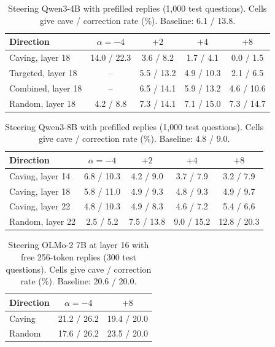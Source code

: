 \begin{table}[tbp]
\centering
\small
\caption{Steering Qwen3-4B with prefilled replies (1{,}000 test questions). Cells give cave / correction rate (\%). Baseline: 6.1 / 13.8.}
\label{tab:steer4b}
\begin{tabular}{lcccc}
\toprule
Direction & $\alpha=-4$ & $+2$ & $+4$ & $+8$ \\
\midrule
Caving, layer 18 & 14.0 / 22.3 & 3.6 / 8.2 & 1.7 / 4.1 & 0.0 / 1.5 \\
Targeted, layer 18 & -- & 5.5 / 13.2 & 4.9 / 10.3 & 2.1 / 6.5 \\
Combined, layer 18 & -- & 6.5 / 14.1 & 5.9 / 13.2 & 4.6 / 10.6 \\
Random, layer 18 & 4.2 / 8.8 & 7.3 / 14.1 & 7.1 / 15.0 & 7.3 / 14.7 \\
\bottomrule
\end{tabular}
\end{table}

\begin{table}[tbp]
\centering
\small
\caption{Steering Qwen3-8B with prefilled replies (1{,}000 test questions). Cells give cave / correction rate (\%). Baseline: 4.8 / 9.0.}
\label{tab:steer8b}
\begin{tabular}{lcccc}
\toprule
Direction & $\alpha=-4$ & $+2$ & $+4$ & $+8$ \\
\midrule
Caving, layer 14 & 6.8 / 10.3 & 4.2 / 9.0 & 3.7 / 7.9 & 3.2 / 7.9 \\
Caving, layer 18 & 5.8 / 11.0 & 4.9 / 9.3 & 4.8 / 9.3 & 4.9 / 9.7 \\
Caving, layer 22 & 4.8 / 10.3 & 4.9 / 8.3 & 4.6 / 7.2 & 5.4 / 6.6 \\
Random, layer 22 & 2.5 / 5.2 & 7.5 / 13.8 & 9.0 / 15.2 & 12.8 / 20.3 \\
\bottomrule
\end{tabular}
\end{table}

\begin{table}[tbp]
\centering
\small
\caption{Steering OLMo-2 7B at layer 16 with free 256-token replies (300 test questions). Cells give cave / correction rate (\%). Baseline: 20.6 / 20.0.}
\label{tab:steerolmo}
\begin{tabular}{lcc}
\toprule
Direction & $\alpha=-4$ & $+8$ \\
\midrule
Caving & 21.2 / 26.2 & 19.4 / 20.0 \\
Random & 17.6 / 26.2 & 23.5 / 20.0 \\
\bottomrule
\end{tabular}
\end{table}

